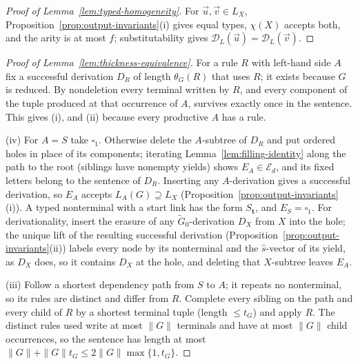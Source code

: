 \documentclass[11pt]{article}
\numberwithin{equation}{section}
\theoremstyle{plain}
\theoremstyle{definition}
\theoremstyle{remark}
\newcommand{\D}{\mathcal{D}}
\newcommand{\tuple}[1]{\vec{#1}}
\newcommand{\blank}{\square}
\theoremstyle{plain}
\begin{document}
\begin{proof}[Proof of Lemma~\ref{lem:typed-homogeneity}]
For $\tuple u,\tuple v\in L_X$, Proposition~\ref{prop:output-invariants}(i) gives equal
types, $\chi(X)$ accepts both, and the arity is at most $f$; substitutability gives
$\D_L(\tuple u)=\D_L(\tuple v)$.
\end{proof}

\begin{proof}[Proof of Lemma~\ref{lem:thickness-equivalence}]
For a rule $R$ with left-hand side $A$ fix a successful derivation $D_R$ of
length $\theta_G(R)$ that uses $R$; it exists because $G$ is reduced.  By
nondeletion every terminal written by $R$, and every component of the tuple
produced at that occurrence of $A$, survives exactly once in the sentence.  This
gives (i), and (ii) because every productive $A$ has a rule.

(iv) For $A=S$ take $\blank_1$.  Otherwise delete the $A$-subtree of $D_R$ and
put ordered holes in place of its components; iterating
Lemma~\ref{lem:filling-identity} along the path to the root (siblings have
nonempty yields) shows $E_A\in\mathcal E_d$, and its fixed letters belong to the
sentence of $D_R$.  Inserting any $A$-derivation gives a successful derivation,
so $E_A$ accepts $L_A(G)\supseteq L_X$
(Proposition~\ref{prop:output-invariants}(i)).  A typed nonterminal with a start
link has the form $S_{\mathbf t}$, and $E_S=\blank_1$.  For derivationality,
insert the erasure of any $\widetilde G_0$-derivation $D_X$ from $X$ into the
hole; the unique lift of the resulting successful derivation
(Proposition~\ref{prop:output-invariants}(ii)) labels every node by its
nonterminal and the $\widehat s$-vector of its yield, as $D_X$ does, so it contains
$D_X$ at the hole, and deleting that $X$-subtree leaves $E_A$.

(iii) Follow a shortest dependency path from $S$ to $A$; it repeats no
nonterminal, so its rules are distinct and differ from $R$.  Complete every
sibling on the path and every child of $R$ by a shortest terminal tuple (length
$\le t_G$) and apply $R$.  The distinct rules used write at most $\|G\|$
terminals and have at most $\|G\|$ child occurrences, so the sentence has length
at most $\|G\|+\|G\|t_G\le2\|G\|\max\{1,t_G\}$.
\end{proof}
\end{document}
